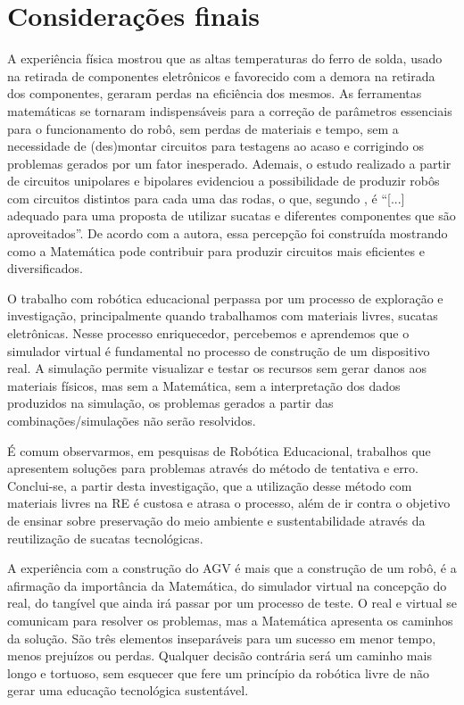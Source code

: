 \documentclass[portuguese]{textolivre}
\begin{document}
\section{Considerações finais}\label{sec-conclusao}
A experiência física mostrou que as altas temperaturas do ferro de solda, usado na retirada de componentes eletrônicos e favorecido com a demora na retirada dos componentes, geraram perdas na eficiência dos mesmos. As ferramentas matemáticas se tornaram indispensáveis para a correção de parâmetros essenciais para o funcionamento do robô, sem perdas de materiais e tempo, sem a necessidade de (des)montar circuitos para testagens ao acaso e corrigindo os problemas gerados por um fator inesperado. Ademais, o estudo realizado a partir de circuitos unipolares e bipolares evidenciou a possibilidade de produzir robôs com circuitos distintos para cada uma das rodas, o que, segundo \textcite[p. 50]{AlvesMonica2022}, é “[...] adequado para uma proposta de utilizar sucatas e diferentes componentes que são aproveitados”. De acordo com a autora, essa percepção foi construída mostrando como a Matemática pode contribuir para produzir circuitos mais eficientes e diversificados.

O trabalho com robótica educacional perpassa por um processo de exploração e investigação, principalmente quando trabalhamos com materiais livres, sucatas eletrônicas. Nesse processo enriquecedor, percebemos e aprendemos que o simulador virtual é fundamental no processo de construção de um dispositivo real. A simulação permite visualizar e testar os recursos sem gerar danos aos materiais físicos, mas sem a Matemática, sem a interpretação dos dados produzidos na simulação, os problemas gerados a partir das combinações/simulações não serão resolvidos.

É comum observarmos, em pesquisas de Robótica Educacional, trabalhos que apresentem soluções para problemas através do método de tentativa e erro. Conclui-se, a partir desta investigação, que a utilização desse método com materiais livres na RE é custosa e atrasa o processo, além de ir contra o objetivo de ensinar sobre preservação do meio ambiente e sustentabilidade através da reutilização de sucatas tecnológicas.

A experiência com a construção do AGV é mais que a construção de um robô, é a afirmação da importância da Matemática, do simulador virtual na concepção do real, do tangível que ainda irá passar por um processo de teste. O real e virtual se comunicam para resolver os problemas, mas a Matemática apresenta os caminhos da solução. São três elementos inseparáveis para um sucesso em menor tempo, menos prejuízos ou perdas. Qualquer decisão contrária será um caminho mais longo e tortuoso, sem esquecer que fere um princípio da robótica livre de não gerar uma educação tecnológica sustentável.
\end{document}
